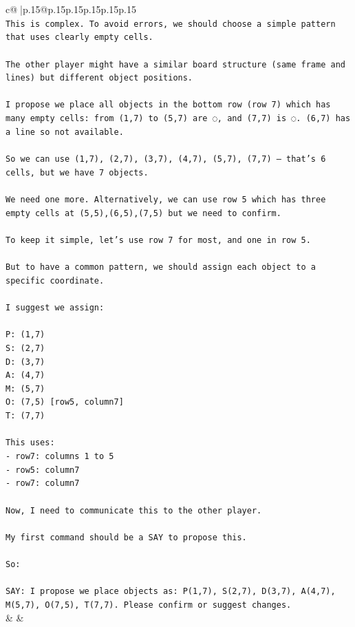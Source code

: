 \documentclass{article}
\begin{document}
{\begin{supertabular}{c@{$\;$}|p{.15\linewidth}@{}p{.15\linewidth}p{.15\linewidth}p{.15\linewidth}p{.15\linewidth}p{.15\linewidth}}
{{{\\ 
\texttt{This is complex. To avoid errors, we should choose a simple pattern that uses clearly empty cells.} \\
\\ 
\texttt{The other player might have a similar board structure (same frame and lines) but different object positions.} \\
\\ 
\texttt{I propose we place all objects in the bottom row (row 7) which has many empty cells: from (1,7) to (5,7) are ◌, and (7,7) is ◌. (6,7) has a line so not available.} \\
\\ 
\texttt{So we can use (1,7), (2,7), (3,7), (4,7), (5,7), (7,7) — that's 6 cells, but we have 7 objects.} \\
\\ 
\texttt{We need one more. Alternatively, we can use row 5 which has three empty cells at (5,5),(6,5),(7,5) but we need to confirm.} \\
\\ 
\texttt{To keep it simple, let's use row 7 for most, and one in row 5.} \\
\\ 
\texttt{But to have a common pattern, we should assign each object to a specific coordinate.} \\
\\ 
\texttt{I suggest we assign:} \\
\\ 
\texttt{P: (1,7)} \\
\texttt{S: (2,7)} \\
\texttt{D: (3,7)} \\
\texttt{A: (4,7)} \\
\texttt{M: (5,7)} \\
\texttt{O: (7,5)   {[}row5, column7{]}} \\
\texttt{T: (7,7)} \\
\\ 
\texttt{This uses:} \\
\texttt{{-} row7: columns 1 to 5} \\
\texttt{{-} row5: column7} \\
\texttt{{-} row7: column7} \\
\\ 
\texttt{Now, I need to communicate this to the other player.} \\
\\ 
\texttt{My first command should be a SAY to propose this.} \\
\\ 
\texttt{So:} \\
\\ 
\texttt{SAY: I propose we place objects as: P(1,7), S(2,7), D(3,7), A(4,7), M(5,7), O(7,5), T(7,7). Please confirm or suggest changes.} \\
            }
        }
    }
    & & \\ \\


\end{supertabular}}
\end{document}
